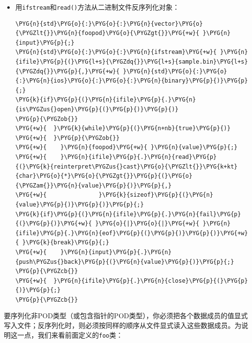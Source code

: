\begin{itemize}

\item 用\texttt{ifstream}和\texttt{read()}方法从二进制文件反序列化对象：


\begin{codeblockbg}
\begin{Verbatim}[commandchars=\\\{\},breaklines=true,breakanywhere=true,fontsize=\codefont,xleftmargin=17bp]
\PYG{n}{std}\PYG{o}{:}\PYG{o}{:}\PYG{n}{vector}\PYG{o}{\PYGZlt{}}\PYG{n}{foopod}\PYG{o}{\PYGZgt{}}\PYG{+w}{ }\PYG{n}{input}\PYG{p}{;}
\PYG{n}{std}\PYG{o}{:}\PYG{o}{:}\PYG{n}{ifstream}\PYG{+w}{ }\PYG{n}{ifile}\PYG{p}{(}\PYG{l+s}{\PYGZdq{}}\PYG{l+s}{sample.bin}\PYG{l+s}{\PYGZdq{}}\PYG{p}{,}\PYG{+w}{ }\PYG{n}{std}\PYG{o}{:}\PYG{o}{:}\PYG{n}{ios}\PYG{o}{:}\PYG{o}{:}\PYG{n}{binary}\PYG{p}{)}\PYG{p}{;}
\PYG{k}{if}\PYG{p}{(}\PYG{n}{ifile}\PYG{p}{.}\PYG{n}{is\PYGZus{}open}\PYG{p}{(}\PYG{p}{)}\PYG{p}{)}
\PYG{p}{\PYGZob{}}
\PYG{+w}{  }\PYG{k}{while}\PYG{p}{(}\PYG{n+nb}{true}\PYG{p}{)}
\PYG{+w}{  }\PYG{p}{\PYGZob{}}
\PYG{+w}{    }\PYG{n}{foopod}\PYG{+w}{ }\PYG{n}{value}\PYG{p}{;}
\PYG{+w}{    }\PYG{n}{ifile}\PYG{p}{.}\PYG{n}{read}\PYG{p}{(}\PYG{k}{reinterpret\PYGZus{}cast}\PYG{o}{\PYGZlt{}}\PYG{k+kt}{char}\PYG{o}{*}\PYG{o}{\PYGZgt{}}\PYG{p}{(}\PYG{o}{\PYGZam{}}\PYG{n}{value}\PYG{p}{)}\PYG{p}{,}
\PYG{+w}{               }\PYG{k}{sizeof}\PYG{p}{(}\PYG{n}{value}\PYG{p}{)}\PYG{p}{)}\PYG{p}{;}
\PYG{k}{if}\PYG{p}{(}\PYG{n}{ifile}\PYG{p}{.}\PYG{n}{fail}\PYG{p}{(}\PYG{p}{)}\PYG{+w}{ }\PYG{o}{|}\PYG{o}{|}\PYG{+w}{ }\PYG{n}{ifile}\PYG{p}{.}\PYG{n}{eof}\PYG{p}{(}\PYG{p}{)}\PYG{p}{)}\PYG{+w}{ }\PYG{k}{break}\PYG{p}{;}
\PYG{+w}{    }\PYG{n}{input}\PYG{p}{.}\PYG{n}{push\PYGZus{}back}\PYG{p}{(}\PYG{n}{value}\PYG{p}{)}\PYG{p}{;}
\PYG{p}{\PYGZcb{}}
\PYG{+w}{  }\PYG{n}{ifile}\PYG{p}{.}\PYG{n}{close}\PYG{p}{(}\PYG{p}{)}\PYG{p}{;}
\PYG{p}{\PYGZcb{}}
\end{Verbatim}
\end{codeblockbg}

\end{itemize}



要序列化非POD类型（或包含指针的POD类型），你必须把各个数据成员的值显式写入文件；反序列化时，则必须按同样的顺序从文件显式读入这些数据成员。为说明这一点，我们来看前面定义的\texttt{foo}类：



